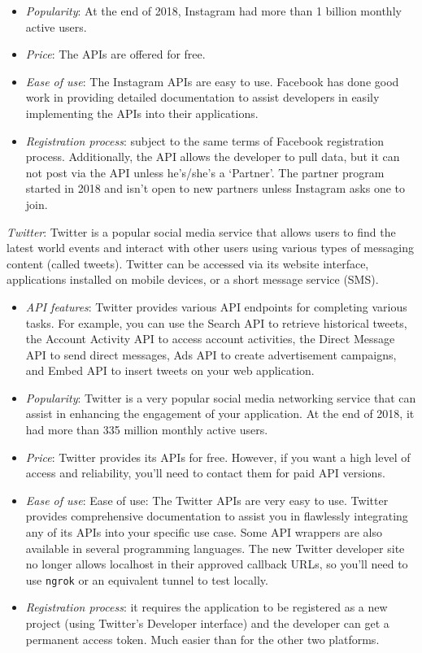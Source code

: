 \begin{enum-c}
\begin{itemize}
  accounts. With the Graph API, you can conveniently manage and publish media
  objects, discover other businesses, track mentions, analyze valuable metrics,
  moderate comments, and search hashtags.
\item \emph{Popularity}:
  At the end of 2018, Instagram had more than 1 billion monthly active users.
\item \emph{Price}:
  The APIs are offered for free.
\item \emph{Ease of use}:
  The Instagram APIs are easy to use. Facebook has done good
  work in providing detailed documentation to assist developers in easily
  implementing the APIs into their applications.
\item \emph{Registration process}: subject to the same terms of Facebook
  registration process. Additionally, the API allows the developer to pull data, but it can
  not post via the API unless he's/she's a `Partner'. The partner
 program started in 2018 and isn't open to new partners unless Instagram asks
 one to join.  
\end{itemize}
%
\item \emph{Twitter}:
Twitter is a popular social media service that allows users to find the latest
world events and interact with other users using various types of messaging
content (called tweets). Twitter can be accessed via its website interface,
applications installed on mobile devices, or a short message service (SMS).
\begin{itemize}
\item \emph{API features}:
  Twitter provides various API endpoints for completing various tasks. For example, you can use the Search API to retrieve historical tweets, the Account Activity API to access account activities, the Direct Message API to send direct messages, Ads API to create advertisement campaigns, and Embed API to insert tweets on your web application.
\item \emph{Popularity}:
Twitter is a very popular social media networking service that can assist in enhancing the engagement of your application. At the end of 2018, it had more than 335 million monthly active users.
\item \emph{Price}:
Twitter provides its APIs for free. However, if you want a high level of access and reliability, you’ll need to contact them for paid API versions.
\item \emph{Ease of use}:
Ease of use: The Twitter APIs are very easy to use. Twitter provides
comprehensive documentation to assist you in flawlessly integrating any of its
APIs into your specific use case. Some API wrappers are also available in
several programming languages. The new Twitter developer site no longer allows
localhost in their approved callback URLs, so you’ll need to use \texttt{ngrok} or an equivalent tunnel to test locally.
\item \emph{Registration process}: it requires the application to be registered as a
  new project (using Twitter's Developer interface) and the developer can get a
  permanent access token. Much easier than for the other two platforms.
\end{itemize}
\end{enum-c}

